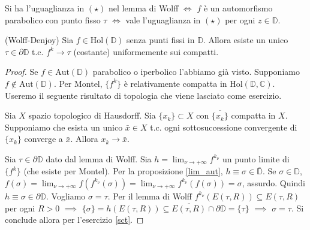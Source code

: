 \begin{exc}
  Si ha l'uguaglianza in $(\star)$ nel lemma di Wolff $\iff$ $f$ è un automorfismo parabolico con punto fisso $\tau$ $\iff$ vale l'uguaglianza in $(\star)$ per ogni $z \in \mathbb{D}$.
\end{exc}

\begin{thm}
  (Wolff-Denjoy) Sia $f \in \text{Hol}(\mathbb{D})$ senza punti fissi in $\mathbb{D}$. Allora esiste un unico $\tau \in \partial\mathbb{D}$ t.c. $f^k \longrightarrow \tau$ (costante) uniformemente sui compatti.
\end{thm}

\begin{proof}
  Se $f \in \text{Aut}(\mathbb{D})$ parabolico o iperbolico l'abbiamo già visto. Supponiamo $f \not\in \text{Aut}(\mathbb{D})$. Per Montel, $\{f^k\}$ è relativamente compatta in $\text{Hol}(\mathbb{D}, \mathbb{C})$. Useremo il seguente risultato di topologia che viene lasciato come esercizio.

  \begin{exc} \label{sct}
    Sia $X$ spazio topologico di Hausdorff. Sia $\{x_k\} \subset X$ con $\overline{\{x_k\}}$ compatta in $X$. Supponiamo che esista un unico $\bar{x} \in X$ t.c. ogni sottosuccessione convergente di $\{x_k\}$ converge a $\bar{x}$. Allora $x_k \longrightarrow \bar{x}$.
  \end{exc}

  Sia $\tau \in \partial\mathbb{D}$ dato dal lemma di Wolff. Sia $\displaystyle h=\lim_{\nu \longrightarrow +\infty} f^{k_{\nu}}$ un punto limite di $\{f^k\}$ (che esiste per Montel). Per la proposizione \ref{lim_aut}, $h \equiv \sigma \in \overline{\mathbb{D}}$.
  Se $\sigma \in \mathbb{D}$, $\displaystyle f(\sigma)=\lim_{\nu \longrightarrow +\infty} f(f^{k_{\nu}}(\sigma))=\lim_{\nu \longrightarrow +\infty} f^{k_{\nu}}(f(\sigma))=\sigma$, assurdo. Quindi $h \equiv \sigma \in \partial\mathbb{D}$.
  Vogliamo $\sigma=\tau$. Per il lemma di Wolff $f^{k_{\nu}}(E(\tau, R)) \subseteq E(\tau, R)$ per ogni $R>0$ $\implies$ $\{\sigma\}=h(E(\tau, R)) \subseteq \overline{E(\tau, R)} \cap \partial\mathbb{D}=\{\tau\}$ $\implies$ $\sigma=\tau$.
  Si conclude allora per l'esercizio \ref{sct}.
\end{proof}
